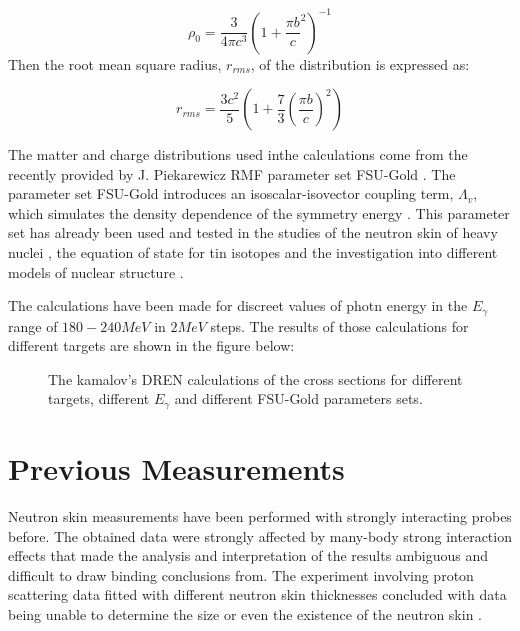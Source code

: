 \begin{equation}
\rho_{0}=\frac{3}{4\pi c^{3}}\left(1+\frac{\pi b}{c}^{2}\right)^{-1}
\end{equation}
Then the root mean square radius, $r_{rms}$, of the distribution is expressed as:

\begin{equation}
r_{rms}=\frac{3c^{2}}{5}\left(1+\frac{7}{3}\left(\frac{\pi b}{c}\right)^{2}\right)
\end{equation}

\indent The matter and charge distributions used inthe calculations come from the recently provided by J. Piekarewicz RMF parameter set FSU-Gold \cite{piek2}. The parameter set FSU-Gold introduces an isoscalar-isovector coupling term, $\Lambda_{v}$, which simulates the density dependence of the symmetry energy \cite{sheng}. This parameter set has already been used and tested in the studies of the neutron skin of heavy nuclei \cite{piek3}, the equation of state for tin isotopes \cite{piek4} and the investigation into different models of nuclear structure \cite{piek5}.

\indent The calculations have been made for discreet values of photn energy in the $E_{\gamma}$ range of $180-240 MeV$ in $2 MeV$ steps. The results of those calculations for different targets are shown in the figure below:

\begin{figure}[H]
\begin{center}
\caption{The kamalov's DREN calculations of the cross sections for different targets, different $E_{\gamma}$ and different FSU-Gold parameters sets.}
\label{kamalov_tg}
\end{center}
\end{figure}


\section{Previous Measurements}

\indent Neutron skin measurements have been performed with strongly interacting probes before. The obtained data were strongly affected by many-body strong interaction effects that made the analysis and interpretation of the results ambiguous and difficult to draw binding conclusions from. The experiment involving proton scattering data fitted with different neutron skin thicknesses concluded with data being unable to determine the size or even the existence of the neutron skin \cite{piek}.

